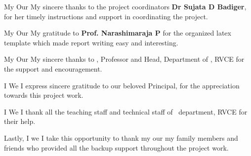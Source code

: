 \ifPG My \else \ifStuNameBUsed Our \else My \fi\fi sincere thanks to the project coordinators \textbf{Dr Sujata D Badiger}, for her timely instructions and support in coordinating the project.\\ \par

\ifPG My \else \ifStuNameBUsed Our \else My \fi\fi gratitude to \textbf{Prof. Narashimaraja P} for the organized latex template which made report writing easy and interesting.\\ \par


\ifPG My \else \ifStuNameBUsed Our \else My \fi\fi sincere thanks to \textbf{\printHOD}, Professor and Head, Department of \printDepartmentLF, RVCE for the support and encouragement.\\ \par

\ifPG I \else \ifStuNameBUsed We \else I \fi\fi express sincere gratitude to our beloved Principal, \textbf{\printPrincipal} for the appreciation towards this project work.\\ \par

\ifPG I \else\ifStuNameBUsed We \else I \fi\fi thank all the teaching staff and technical staff of \printDepartmentLF\, department, RVCE for their help.\\ \par 

Lastly, \ifPG I \else\ifStuNameBUsed we \else I \fi\fi take this opportunity to thank \ifPG my \else\ifStuNameBUsed our \else my \fi\fi family members and friends who provided all the backup support throughout the project work.\\ \par

